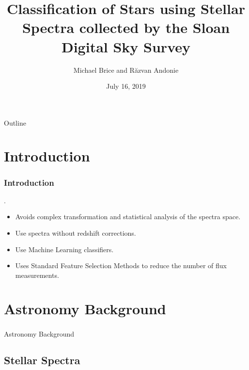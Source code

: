 \documentclass[aspectratio=169]{beamer}
\title{\huge Classification of Stars using Stellar Spectra collected by the Sloan Digital Sky Survey}
\author{Michael Brice and R\u{a}zvan Andonie}
\institute{Computer Science Department: Central Washington University}
\date{July 16, 2019}
\begin{document}
\begin{frame}[plain]
    \titlepage
\end{frame}

\begin{frame}{Outline}
\begin{multicols}{2}
  \tableofcontents
\end{multicols}
\end{frame}


\section{Introduction} 

\begin{frame}
\frametitle{Introduction}
. 
\begin{itemize}
	\item Avoids complex transformation and statistical analysis of the spectra space.
	\item Use spectra without redshift corrections.
	\item Use Machine Learning classifiers.
	\item Uses Standard Feature Selection Methods to reduce the number of flux measurements.
\end{itemize} 

\end{frame}


\section{Astronomy Background}
\begin{frame}
\frametitle{}

\begin{center}
\LARGE
Astronomy Background
\end{center}

\end{frame}

\subsection{Stellar Spectra}
\end{document}

